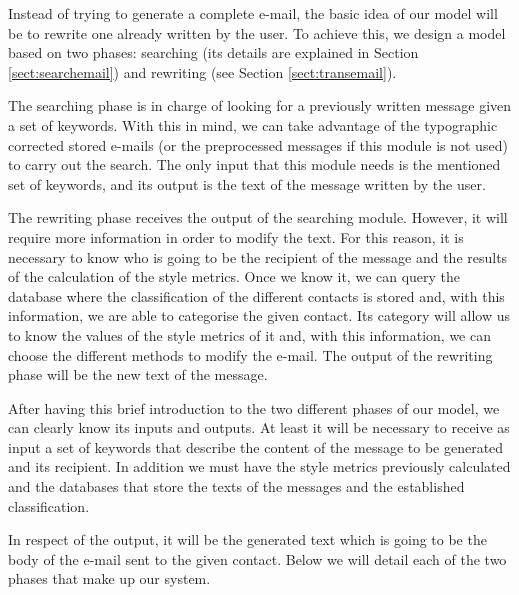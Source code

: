 Instead of trying to generate a complete e-mail, the basic idea of our model will be to rewrite one already written by the user. To achieve this, we design a model based on two phases: searching (its details are explained in Section \ref{sect:searchemail}) and rewriting (see Section \ref{sect:transemail}).

The searching phase is in charge of looking for a previously written message given a set of keywords. With this in mind, we can take advantage of the typographic corrected stored e-mails (or the preprocessed messages if this module is not used) to carry out the search. The only input that this module needs is the mentioned set of keywords, and its output is the text of the message written by the user.

The rewriting phase receives the output of the searching module. However, it will require more information in order to modify the text. For this reason, it is necessary to know who is going to be the recipient of the message and the results of the calculation of the style metrics. Once we know it, we can query the database where the classification of the different contacts is stored and, with this information, we are able to categorise the given contact. Its category will allow us to know the values of the style metrics of it and, with this information, we can choose the different methods to modify the e-mail. The output of the rewriting phase will be the new text of the message.

After having this brief introduction to the two different phases of our model, we can clearly know its inputs and outputs. At least it will be necessary to receive as input a set of keywords that describe the content of the message to be generated and its recipient. In addition we must have the style metrics previously calculated and the databases that store the texts of the messages and the established classification.

In respect of the output, it will be the generated text which is going to be the body of the e-mail sent to the given contact. Below we will detail each of the two phases that make up our system.